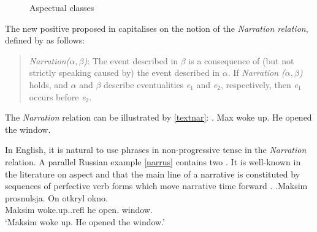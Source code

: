 \begin{figure}
\caption{\label{circles}Aspectual classes}
\end{figure}

The new positive  proposed in \citet{ZinovaFilip:13} capitalises on the notion of the \textit{Narration relation}, defined by \citet{Lascarides:93} as follows:

\begin{quote}
\textit{Narration($\alpha,\beta$)}: The event described in $\beta$ is a consequence of (but not strictly speaking caused by) the event described in $\alpha$. If \textit{Narration ($\alpha,\beta$)} holds, and $\alpha$ and $\beta$ describe eventualities \textit{e$_1$} and \textit{e$_2$}, respectively, then \textit{e$_1$} occurs before \textit{e$_2$}.
\end{quote}

The \textit{Narration} relation can be illustrated by \ref{textnar}: 
\ex.\label{textnar} Max woke up. He opened the window. 

In English, it is natural to use  phrases in non-progressive tense in the \textit{Narration} relation. A parallel Russian example \ref{narrus} contains two . It is well-known  in the literature on aspect and  that the main line of a narrative is constituted by sequences of perfective verb forms which move narrative time forward \citep[for Russian, see in particular][]{Paducheva:96, Paducheva:04}.
\exg.\label{narrus}Maksim prosnulsja\textsuperscript{\PF}. On otkryl\textsuperscript{\PF} okno.\\
Maksim woke.up..refl he open. window.\\
\trans `Maksim woke up. He opened the window.'

